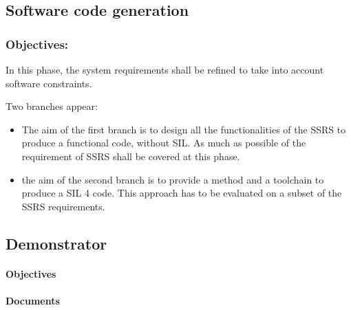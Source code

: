 
\subsection{Software code generation}
\label{sec:sw-code}



\subsubsection{Objectives:}
\label{sec:sw-req-objective}


In this phase, the system requirements shall be refined to take into account software constraints.

Two branches appear:
\begin{itemize}
\item  The aim of the first branch  is to  design all the functionalities of the SSRS to  produce a functional code, without SIL. As much as possible of the requirement of SSRS shall be covered at this phase.
\item the aim  of the second branch is to provide a method and a toolchain to produce a SIL 4 code. This approach has to be evaluated on a subset of the SSRS requirements.
\end{itemize}




\subsection{Demonstrator}
\label{sec:demo-phase}


\paragraph{Objectives}
\label{sec:demo-objective}

\begin{comment}
What is the aim of the demonstrator ?  to provide an executable model of the on-board unit
What does that mean,
Which functionalities have to be taken into account ? Which are the interfaces and API ?
Does it take into account real-time, performance,... elements or just functional aspects ? What about safety ? What is the target platform ?
Non safety code ?
\end{comment}


\paragraph{Documents}
\label{sec:demo-documents}

